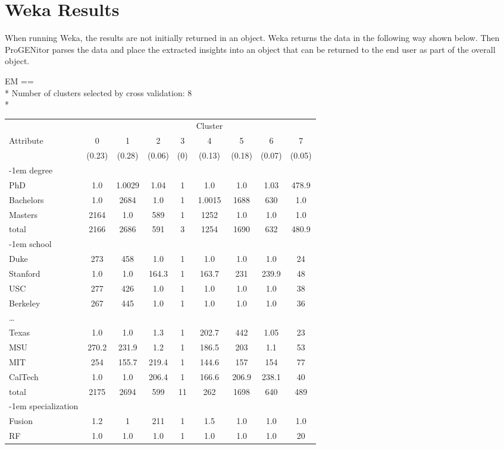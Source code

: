 \section{Weka Results}
\label{sect:weka-results}
When running Weka, the results are not initially returned in an object. 
Weka returns the data in the following way shown below.  Then ProGENitor parses
the data and place the extracted insights into an object that can be returned to
the end user as part of the overall object.

\pagebreak 
\begin{tt}
\begin{footnotesize}
\noindent EM
\noindent ==\\*
\noindent Number of clusters selected by cross validation: 8\\*                           
\begin{tabular}{lcccccccc} 
&&&&&Cluster\\
Attribute&0&1&2&3&4&5&6&7\\
&(0.23)&(0.28)&(0.06)&(0)&(0.13)&(0.18)&(0.07)&(0.05)\\
\kern-1em degree\\
PhD&1.0&1.0029&1.04&1&1.0&1.0&1.03&478.9\\
Bachelors&1.0&2684&1.0&1&1.0015&1688&630&1.0\\
Masters&2164&1.0&589&1&1252&1.0&1.0&1.0\\
total&2166&2686&591&3&1254&1690&632&480.9\\
\kern-1em school\\
Duke&273&458&1.0&1&1.0&1.0&1.0&24\\
Stanford&1.0&1.0&164.3&1&163.7&231&239.9&48\\
USC&277&426&1.0&1&1.0&1.0&1.0&38\\
Berkeley&267&445&1.0&1&1.0&1.0&1.0&36\\
\ldots&&&&&&&&\\
Texas&1.0&1.0&1.3&1&202.7&442&1.05&23\\ 
MSU&270.2&231.9&1.2&1&186.5&203&1.1&53\\
MIT&254&155.7&219.4&1&144.6&157&154&77\\
CalTech&1.0&1.0&206.4&1&166.6&206.9&238.1&40\\ 
total&2175&2694&599&11&262&1698&640&489\\
\kern-1em specialization\\ 
Fusion&1.2&1&211&1&1.5&1.0&1.0&1.0\\ 
RF&1.0&1.0&1.0&1&1.0&1.0&1.0&20\\ 

\end{tabular}
\end{footnotesize}
\end{tt}

